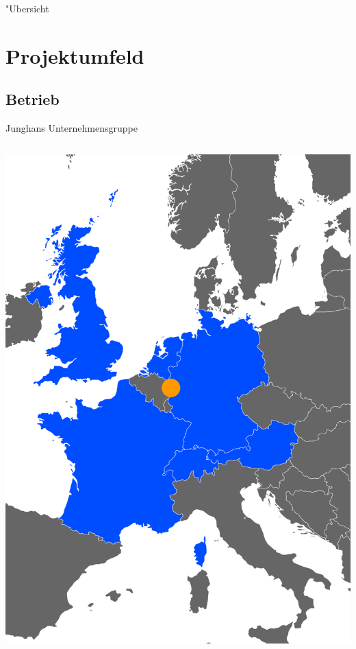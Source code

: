 \setcounter{figure}{0}

\begin{frame}{"Ubersicht}
  \tableofcontents
\end{frame}

\section{Projektumfeld}

\subsection{Betrieb}
\begin{frame}{Junghans Unternehmensgruppe}
	\begin{columns}
		\begin{column}{.45\textwidth}
			\includegraphics[width=\textwidth]{images/KarteJUG}
		\end{column}

\end{columns}
\end{frame}
